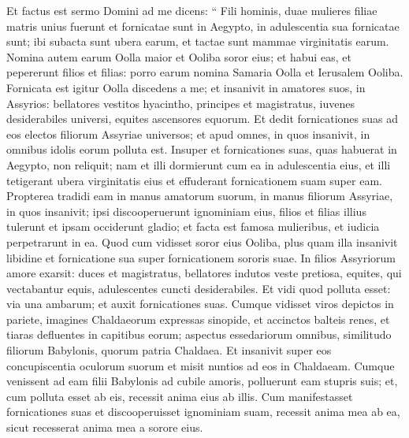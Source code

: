\begin{biblechapter}
\begin{biblechapter}
\begin{biblechapter}
\begin{biblechapter}
\begin{biblechapter}
\begin{biblechapter}
\begin{biblechapter}
\begin{biblechapter}
\begin{biblechapter}
\begin{biblechapter}
\begin{biblechapter}
\begin{biblechapter}
\begin{biblechapter}
\begin{biblechapter}
\begin{biblechapter}
\begin{biblechapter}
\begin{biblechapter}
\begin{biblechapter}
\begin{biblechapter}
\begin{biblechapter}
\begin{biblechapter}
\begin{biblechapter}
\begin{biblechapter}
\verse Et factus est sermo Domini ad me dicens: 
\verse “ Fili hominis, duae mulieres filiae matris unius fuerunt 
\verse et fornicatae sunt in Aegypto, in adulescentia sua fornicatae sunt; ibi subacta sunt ubera earum, et tactae sunt mammae virginitatis earum. 
\verse Nomina autem earum Oolla maior et Ooliba soror eius; et habui eas, et pepererunt filios et filias: porro earum nomina Samaria Oolla et Ierusalem Ooliba. 
\verse Fornicata est igitur Oolla discedens a me; et insanivit in amatores suos, in Assyrios: bellatores 
\verse vestitos hyacintho, principes et magistratus, iuvenes desiderabiles universi, equites ascensores equorum. 
\verse Et dedit fornicationes suas ad eos electos filiorum Assyriae universos; et apud omnes, in quos insanivit, in omnibus idolis eorum polluta est. 
\verse Insuper et fornicationes suas, quas habuerat in Aegypto, non reliquit; nam et illi dormierunt cum ea in adulescentia eius, et illi tetigerant ubera virginitatis eius et effuderant fornicationem suam super eam. 
\verse Propterea tradidi eam in manus amatorum suorum, in manus filiorum Assyriae, in quos insanivit; 
\verse ipsi discooperuerunt ignominiam eius, filios et filias illius tulerunt et ipsam occiderunt gladio; et facta est famosa mulieribus, et iudicia perpetrarunt in ea.
 \verse Quod cum vidisset soror eius Ooliba, plus quam illa insanivit libidine et fornicatione sua super fornicationem sororis suae. 
\verse In filios Assyriorum amore exarsit: duces et magistratus, bellatores indutos veste pretiosa, equites, qui vectabantur equis, adulescentes cuncti desiderabiles. 
\verse Et vidi quod polluta esset: via una ambarum; 
\verse et auxit fornicationes suas. Cumque vidisset viros depictos in pariete, imagines Chaldaeorum expressas sinopide, 
 \verse et accinctos balteis renes, et tiaras defluentes in capitibus eorum; aspectus essedariorum omnibus, similitudo filiorum Babylonis, quorum patria Chaldaea. 
 \verse Et insanivit super eos concupiscentia oculorum suorum et misit nuntios ad eos in Chaldaeam. 
\verse Cumque venissent ad eam filii Babylonis ad cubile amoris, polluerunt eam stupris suis; et, cum polluta esset ab eis, recessit anima eius ab illis. 
\verse Cum manifestasset fornicationes suas et discooperuisset ignominiam suam, recessit anima mea ab ea, sicut recesserat anima mea a sorore eius. 

\end{biblechapter}
\end{biblechapter}
\end{biblechapter}
\end{biblechapter}
\end{biblechapter}
\end{biblechapter}
\end{biblechapter}
\end{biblechapter}
\end{biblechapter}
\end{biblechapter}
\end{biblechapter}
\end{biblechapter}
\end{biblechapter}
\end{biblechapter}
\end{biblechapter}
\end{biblechapter}
\end{biblechapter}
\end{biblechapter}
\end{biblechapter}
\end{biblechapter}
\end{biblechapter}
\end{biblechapter}
\end{biblechapter}
